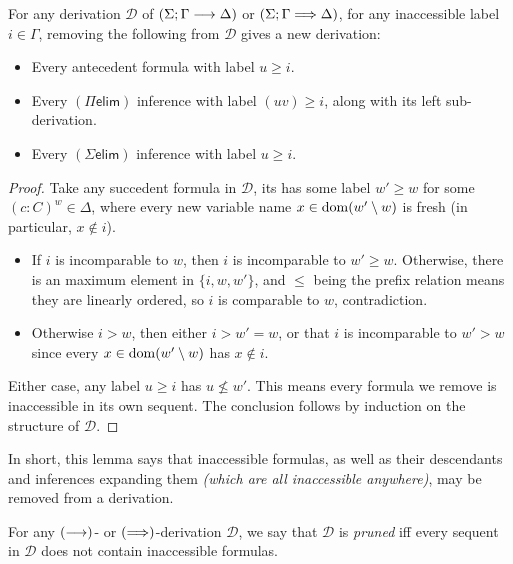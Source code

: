 \documentclass[twoside]{report}
\begin{document}
\begin{proposition}
    \label{thm:sequent_calculi_pruning_step}
    For any derivation $\mathcal D$ of $(\Sigma; \Gamma \longrightarrow \Delta)$ or $(\Sigma; \Gamma \Longrightarrow \Delta)$, for any inaccessible label $i \in \Gamma$, removing the following from $\mathcal D$ gives a new derivation:
    \begin{itemize}[noitemsep]
        \item Every antecedent formula with label $u \geq i$.
        \item Every $(\Pi\mathsf{elim})$ inference with label $(uv) \geq i$, along with its left sub-derivation.
        \item Every $(\Sigma\mathsf{elim})$ inference with label $u \geq i$.
    \end{itemize}
\end{proposition}

\begin{proof}
    Take any succedent formula in $\mathcal D$, its has some label $w' \geq w$ for some $(c : C)^w \in \Delta$, where every new variable name $x \in \operatorname{dom} (w' \setminus w)$ is fresh (in particular, $x \notin i$).
    \begin{itemize}
        \item If $i$ is incomparable to $w$, then $i$ is incomparable to $w' \geq w$. Otherwise, there is an maximum element in $\{i, w, w'\}$, and $\leq$ being the prefix relation means they are linearly ordered, so $i$ is comparable to $w$, contradiction.
        \item Otherwise $i > w$, then either $i > w' = w$, or that $i$ is incomparable to $w' > w$ since every $x \in \operatorname{dom} (w' \setminus w)$ has $x \notin i$.
    \end{itemize}
    Either case, any label $u \geq i$ has $u \not\leq w'$. This means every formula we remove is inaccessible in its own sequent. The conclusion follows by induction on the structure of $\mathcal D$.
\end{proof}

In short, this lemma says that inaccessible formulas, as well as their descendants and inferences expanding them \emph{(which are all inaccessible anywhere)}, may be removed from a derivation.

\begin{definition}
    \label{def:sequent_calculi_pruned_derivations}
    For any $(\longrightarrow)$- or $(\Longrightarrow)$-derivation $\mathcal D$, we say that $\mathcal D$ is \emph{pruned} iff every sequent in $\mathcal D$ does not contain inaccessible formulas.
\end{definition}
\end{document}
